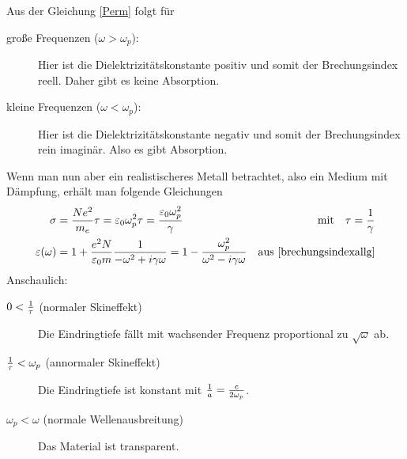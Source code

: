 Aus der Gleichung \ref{Perm} folgt für
\begin{description}
	\item[große Frequenzen ($\omega>\omega_p$):] Hier ist die
      Dielektrizitätskonstante positiv und somit der Brechungsindex
      reell. Daher gibt es keine Absorption. 
	\item[kleine Frequenzen ($\omega<\omega_p$):] Hier ist die
      Dielektrizitätskonstante negativ und somit der Brechungsindex
      rein imaginär. Also es gibt Absorption. 
\end{description}
Wenn man nun aber ein realistischeres Metall betrachtet, also ein Medium
mit Dämpfung, erhält man folgende Gleichungen
\begin{align*}
  \sigma
  &= \frac{Ne^2}{m_e}\tau
    = \varepsilon_0\omega_p^2 \tau
    = \frac{\varepsilon_0\omega_p^2}{\gamma}
  &\text{mit}\quad \tau=\frac{1}{\gamma}\\
  \varepsilon(\omega)
  &= 1 + \frac{e^2N}{\varepsilon_0 m}\frac{1}{-\omega^2+i\gamma\omega}
    = 1 - \frac{\omega_p^2}{\omega^2-i\gamma\omega}
  &\text{aus \eqref{brechungsindexallg}}
\end{align*}%
%
Anschaulich:
\begin{description}
  \item[$0 < \frac{1}{\tau}$ (normaler Skineffekt)]
    Die Eindringtiefe fällt mit wachsender Frequenz proportional zu
      $\sqrt{\omega}$ ab.
  \item[$\frac{1}{\tau}<\omega_p$ (annormaler Skineffekt)]
    Die Eindringtiefe ist konstant mit $\frac{1}{a}=\frac{c}{2\omega_p}$.
  \item[$\omega_p<\omega$ (normale Wellenausbreitung)]
    Das Material ist transparent.
\end{description}


